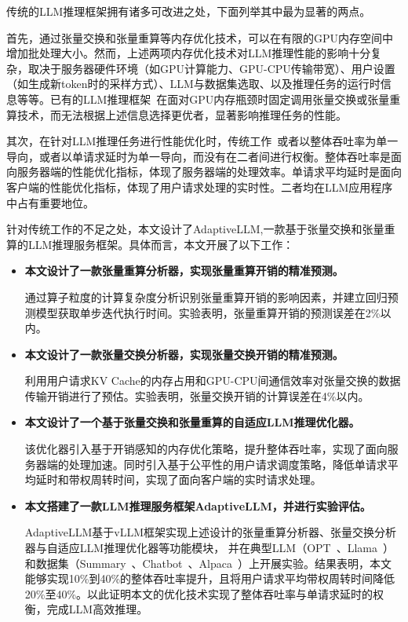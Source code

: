 传统的LLM推理框架拥有诸多可改进之处，下面列举其中最为显著的两点。 \par

首先，通过张量交换和张量重算等内存优化技术，可以在有限的GPU内存空间中增加批处理大小。然而，上述两项内存优化技术对LLM推理性能的影响十分复杂，取决于服务器硬件环境（如GPU计算能力、GPU-CPU传输带宽）、用户设置（如生成新token时的采样方式）、LLM与数据集选取、以及推理任务的运行时信息等等。已有的LLM推理框架~\cite{Swapping, vLLM, ORCA}在面对GPU内存瓶颈时固定调用张量交换或张量重算技术，而无法根据上述信息选择更优者，显著影响推理任务的性能。

其次，在针对LLM推理任务进行性能优化时，传统工作~\cite{Swapping, vLLM, SpecInfer}或者以整体吞吐率为单一导向，或者以单请求延时为单一导向，而没有在二者间进行权衡。整体吞吐率是面向服务器端的性能优化指标，体现了服务器端的处理效率。单请求平均延时是面向客户端的性能优化指标，体现了用户请求处理的实时性。二者均在LLM应用程序中占有重要地位。

针对传统工作的不足之处，本文设计了AdaptiveLLM,一款基于张量交换和张量重算的LLM推理服务框架。具体而言，本文开展了以下工作：

\begin{itemize} 
    
    \item \textbf{本文设计了一款张量重算分析器，实现张量重算开销的精准预测。}     
    \setlength{\parindent}{2em} \par    
    通过算子粒度的计算复杂度分析识别张量重算开销的影响因素，并建立回归预测模型获取单步迭代执行时间。实验表明，张量重算开销的预测误差在2\%以内。
    
    \item \textbf{本文设计了一款张量交换分析器，实现张量交换开销的精准预测。}    
    \setlength{\parindent}{2em} \par    
    利用用户请求KV Cache的内存占用和GPU-CPU间通信效率对张量交换的数据传输开销进行了预估。实验表明，张量交换开销的计算误差在4\%以内。

    \item \textbf{本文设计了一个基于张量交换和张量重算的自适应LLM推理优化器。}    
    \setlength{\parindent}{2em} \par    
    该优化器引入基于开销感知的内存优化策略，提升整体吞吐率，实现了面向服务器端的处理加速。同时引入基于公平性的用户请求调度策略，降低单请求平均延时和带权周转时间，实现了面向客户端的实时请求处理。
    
    \item \textbf{本文搭建了一款LLM推理服务框架AdaptiveLLM，并进行实验评估。}    
    \setlength{\parindent}{2em} \par  
    AdaptiveLLM基于vLLM框架实现上述设计的张量重算分析器、张量交换分析器与自适应LLM推理优化器等功能模块， 并在典型LLM（OPT~\cite{OPT}、Llama~\cite{Llama}）和数据集（Summary~\cite{Summary}、Chatbot~\cite{Chatbot}、Alpaca~\cite{Alpaca}）上开展实验。结果表明，本文能够实现10\%到40\%的整体吞吐率提升，且将用户请求平均带权周转时间降低20\%至40\%。以此证明本文的优化技术实现了整体吞吐率与单请求延时的权衡，完成LLM高效推理。

\end{itemize}